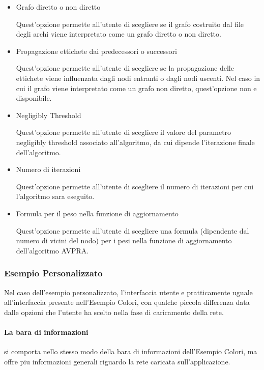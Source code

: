 \documentclass[a4paper,12pt]{report}
\begin{document}
			\begin{itemize}
				\item Grafo diretto o non diretto 

				Quest'opzione permette all'utente di scegliere se il grafo costruito dal file degli archi viene interpretato come un grafo diretto o non diretto.

				\item Propagazione ettichete dai predecessori o successori 

				Quest'opzione permette all'utente di scegliere se la propagazione delle ettichete viene influenzata dagli nodi entranti o dagli nodi uscenti. Nel caso in cui il grafo viene interpretato come un grafo non diretto, quest'opzione non e disponibile.

				\item Negligibly Threshold 

				Quest'opzione permette all'utente di scegliere il valore del parametro negligibly threshold associato all'algoritmo, da cui dipende l'iterazione finale dell'algoritmo.

				\item Numero di iterazioni 

				Quest'opzione permette all'utente di scegliere il numero di iterazioni per cui l'algoritmo sara eseguito.

				\item Formula per il peso nella funzione di aggiornamento 

				Quest'opzione permette all'utente di scegliere una formula (dipendente dal numero di vicini del nodo) per i pesi nella funzione di aggiornamento dell'algoritmo AVPRA.

			\end{itemize}
			
			\subsubsection{Esempio Personalizzato}

			Nel caso dell'esempio personalizzato, l'interfaccia utente e pratticamente uguale all'interfaccia presente nell'Esempio Colori, con qualche piccola differenza data dalle opzioni che l'utente ha scelto nella fase di caricamento della rete.

			\paragraph*{La bara di informazioni} si comporta nello stesso modo della bara di informazioni dell'Esempio Colori, ma offre piu informazioni generali riguardo la rete caricata sull'applicazione.
			
\end{document}
